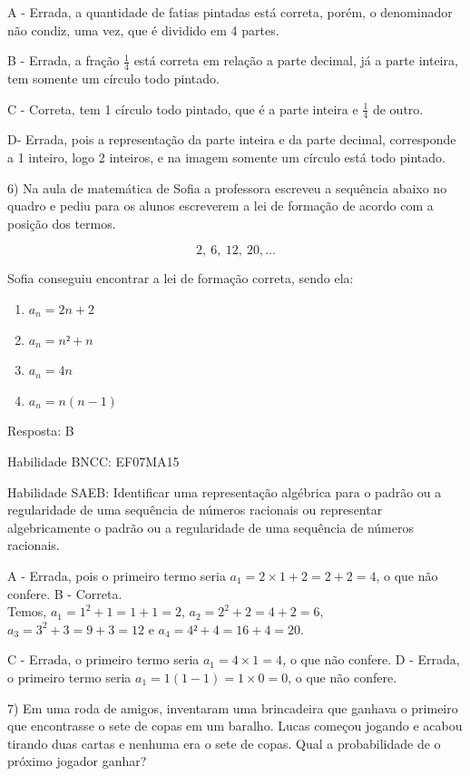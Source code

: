 {{{{{{{{{{{{{{A - Errada, a quantidade de fatias pintadas está correta, porém, o
denominador não condiz, uma vez, que é dividido em 4 partes.

B - Errada, a fração \(\frac{1}{4}\) está correta em relação a parte
decimal, já a parte inteira, tem somente um círculo todo pintado.

C - Correta, tem 1 círculo todo pintado, que é a parte inteira e
\(\frac{1}{4}\) de outro.

D- Errada, pois a representação da parte inteira e da parte decimal,
corresponde a 1 inteiro, logo 2 inteiros, e na imagem somente um círculo
está todo pintado.

6) Na aula de matemática de Sofia a professora escreveu a sequência
abaixo no quadro e pediu para os alunos escreverem a lei de formação de
acordo com a posição dos termos.

\[2,\ 6,\ 12,\ 20,\ldots\]

Sofia conseguiu encontrar a lei de formação correta, sendo ela:

\begin{enumerate}
\def\labelenumi{\alph{enumi})}
\item
  \(a_{n} = 2n + 2\)
\item
  \(a_{n} = n² + n\)
\item
  \(a_{n} = 4n\)
\item
  \(a_{n} = n(n - 1)\)
\end{enumerate}

Resposta: B

Habilidade BNCC: EF07MA15

Habilidade SAEB: Identificar uma representação algébrica para o padrão
ou a regularidade de uma sequência de números racionais ou representar
algebricamente o padrão ou a regularidade de uma sequência de números
racionais.

A - Errada, pois o primeiro termo seria
\(a_{1} = 2 \times 1 + 2 = 2 + 2 = 4\), o que não confere. B -
Correta.\\
Temos, \(a_{1} = 1^{2} + 1 = 1 + 1 = 2\),
\(a_{2} = 2^{2} + 2 = 4 + 2 = 6\), \(a_{3} = 3^{2} + 3 = 9 + 3 = 12\) e
\(a_{4} = 4² + 4 = 16 + 4 = 20\).

C - Errada, o primeiro termo seria \(a_{1} = 4 \times 1 = 4\)\emph{,} o
que não confere.\emph{\hfill\break
}D - Errada, o primeiro termo seria
\(a_{1} = 1\left( 1 - 1 \right) = 1 \times 0 = 0\), o que não confere.

7) Em uma roda de amigos, inventaram uma brincadeira que ganhava o
primeiro que encontrasse o sete de copas em um baralho. Lucas começou
jogando e acabou tirando duas cartas e nenhuma era o sete de copas. Qual
a probabilidade de o próximo jogador ganhar?

}}}}}}}}}}}}}}
